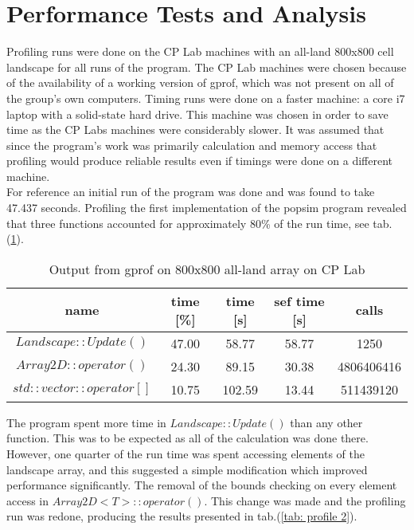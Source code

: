\section{Performance Tests and Analysis}
\label{Performance Tests and Analysis}

\label{Profiling and optimisation}

Profiling runs were done on the CP Lab machines with an all-land 800x800 cell landscape for all runs of the program.  The CP Lab machines were chosen because of the availability of a working version of gprof, which was not present on all of the group's own computers. 
Timing runs were done on a faster machine: a core i7 laptop with a solid-state hard drive. 
This machine was chosen in order to save time as the CP Labs machines were considerably slower. 
It was assumed that since the program's work was primarily calculation and memory access that profiling would produce reliable results even if timings were done on a different machine.\\

For reference an initial run of the program was done and was found to take 47.437 seconds.  Profiling the first implementation of the popsim program revealed that three functions accounted for approximately 80\% of the run time, see tab.(\ref{tab: profile 1}).


\begin{table}
\caption{Output from gprof on 800x800 all-land array on CP Lab}
\label{tab: profile 1}
 \begin{center}
\begin{tabular}{|c|c|c|c|c|}
\hline
name & time [\%] & time [s] & sef time [s] & calls\\
\hline
$Landscape::Update()$ & 47.00 & 58.77 & 58.77 & 1250\\
\hline
$Array2D::operator()$& 24.30 & 89.15 & 30.38& 4806406416\\
\hline
$std::vector::operator[]$& 10.75& 102.59 & 13.44 & 511439120\\
\hline
\end{tabular}
\end{center}
\end{table}


The program spent more time in $Landscape::Update()$ than any other function.
This was to be expected as all of the calculation was done there. However, one quarter of the run time was spent accessing elements of the landscape array, and this suggested a simple modification which improved performance significantly.
The removal of the bounds checking on every element access in $Array2D<T>::operator()$. This change was made and the profiling run was redone, producing the results presented in tab.(\ref{tab: profile 2}).

